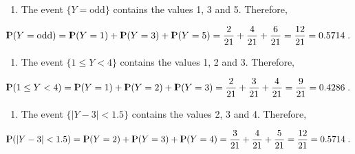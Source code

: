 \documentclass[]{krantz}
\providecommand{\tightlist}{%
  \setlength{\itemsep}{0pt}\setlength{\parskip}{0pt}}
\newcommand{\Prob}{{\rm I\kern-.3em P}}
\theoremstyle{definition}
\theoremstyle{definition}
\theoremstyle{definition}
\theoremstyle{remark}
\begin{document}
\begin{enumerate}
\def\labelenumi{\arabic{enumi}.}
\setcounter{enumi}{2}
\tightlist
\item
  The event \(\{Y = \mbox{odd}\}\) contains the values 1, 3 and 5.
  Therefore,
\end{enumerate}

\[\Prob(Y = \mbox{odd}) = \Prob(Y=1) + \Prob(Y=3) + \Prob(Y=5) = \frac{2}{21} + \frac{4}{21} + \frac{6}{21} = \frac{12}{21}= 0.5714\;.\]

\begin{enumerate}
\def\labelenumi{\arabic{enumi}.}
\setcounter{enumi}{3}
\tightlist
\item
  The event \(\{1 \leq Y < 4\}\) contains the values 1, 2 and 3.
  Therefore,
\end{enumerate}

\[\Prob(1 \leq Y < 4) = \Prob(Y=1) + \Prob(Y=2) + \Prob(Y=3) = \frac{2}{21} + \frac{3}{21} + \frac{4}{21} = \frac{9}{21}= 0.4286\;.\]

\begin{enumerate}
\def\labelenumi{\arabic{enumi}.}
\setcounter{enumi}{4}
\tightlist
\item
  The event \(\{|Y -3| < 1.5\}\) contains the values 2, 3 and 4.
  Therefore,
\end{enumerate}

\[\Prob(|Y -3| < 1.5) = \Prob(Y=2) + \Prob(Y=3) + \Prob(Y=4) = \frac{3}{21} + \frac{4}{21} + \frac{5}{21} = \frac{12}{21}= 0.5714\;.\]
\end{document}
